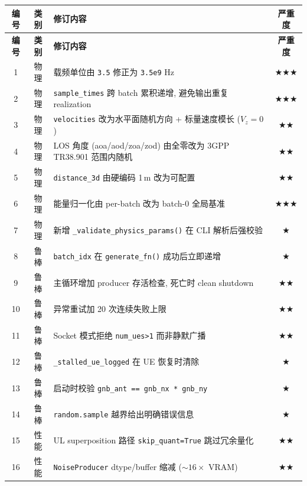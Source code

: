 \documentclass[11pt,a4paper,UTF8,fontset=fandol]{ctexart}
\newcommand{\sone}{\textcolor{starcolor}{$\bigstar$}}
\newcommand{\stwo}{\textcolor{starcolor}{$\bigstar\bigstar$}}
\newcommand{\sthree}{\textcolor{starcolor}{$\bigstar\bigstar\bigstar$}}
\begin{document}
\begin{center}
\renewcommand{\arraystretch}{1.18}
\begin{longtable}{c c p{8.6cm} c}
\toprule
\textbf{编号} & \textbf{类别} & \textbf{修订内容} & \textbf{严重度} \\
\midrule
\endfirsthead
\toprule
\textbf{编号} & \textbf{类别} & \textbf{修订内容} & \textbf{严重度} \\
\midrule
\endhead
\bottomrule
\endfoot

1  & 物理 & 载频单位由 \texttt{3.5} 修正为 \texttt{3.5e9} Hz                 & \sthree \\
2  & 物理 & \texttt{sample\_times} 跨 batch 累积递增, 避免输出重复 realization & \sthree \\
3  & 物理 & \texttt{velocities} 改为水平面随机方向 + 标量速度模长 ($V_z=0$)    & \stwo   \\
4  & 物理 & LOS 角度 (aoa/aod/zoa/zod) 由全零改为 3GPP TR38.901 范围内随机    & \stwo   \\
5  & 物理 & \texttt{distance\_3d} 由硬编码 1\,m 改为可配置                     & \stwo   \\
6  & 物理 & 能量归一化由 per-batch 改为 batch-0 全局基准                       & \sthree \\
7  & 物理 & 新增 \texttt{\_validate\_physics\_params()} 在 CLI 解析后强校验    & \sone   \\
8  & 鲁棒 & \texttt{batch\_idx} 在 \texttt{generate\_fn()} 成功后立即递增      & \sone   \\
9  & 鲁棒 & 主循环增加 producer 存活检查, 死亡时 clean shutdown                & \stwo   \\
10 & 鲁棒 & 异常重试加 20 次连续失败上限                                       & \stwo   \\
11 & 鲁棒 & Socket 模式拒绝 \texttt{num\_ues>1} 而非静默广播                   & \stwo   \\
12 & 鲁棒 & \texttt{\_stalled\_ue\_logged} 在 UE 恢复时清除                    & \sone   \\
13 & 鲁棒 & 启动时校验 \texttt{gnb\_ant == gnb\_nx * gnb\_ny}                  & \sone   \\
14 & 鲁棒 & \texttt{random.sample} 越界给出明确错误信息                        & \sone   \\
15 & 性能 & UL superposition 路径 \texttt{skip\_quant=True} 跳过冗余量化       & \stwo   \\
16 & 性能 & \texttt{NoiseProducer} dtype/buffer 缩减 ($\sim 16\times$ VRAM)    & \stwo   \\

\end{longtable}
\end{center}
\end{document}
